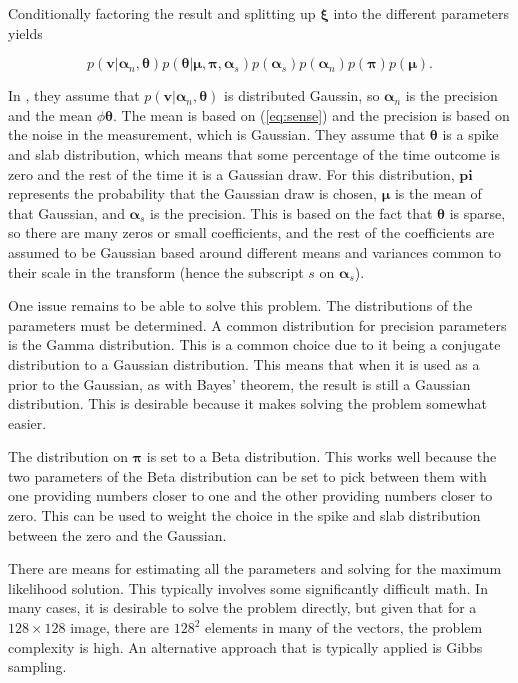 \documentclass{IEEEtran}
\begin{document}
Conditionally factoring the result and splitting up $\mathbf{\xi}$
into the different parameters yields

\begin{equation}
p(\mathbf{v}|\mathbf{\alpha}_n,\mathbf{\theta})p(\mathbf{\theta}|\mathbf{\mu},\mathbf{\pi},\mathbf{\alpha}_s)p(\mathbf{\alpha}_s)p(\mathbf{\alpha}_n)p(\mathbf{\pi})p(\mathbf{\mu}).
\label{bayesprimary}
\end{equation}

In \cite{He09}, they assume that
$p(\mathbf{v}|\mathbf{\alpha}_n,\mathbf{\theta})$ is distributed Gaussin,
so $\mathbf{\alpha}_n$ is the precision and the mean $\phi
\mathbf{\theta}$.  The mean is based on (\ref{eq:sense}) and the
precision is based on the noise in the measurement, which is
Gaussian.  They assume that $\mathbf{\theta}$ is a spike
and slab distribution, which means that some percentage of the time
outcome is zero and the rest of the time it is a Gaussian draw.  For this distribution,
$\mathbf{pi}$ represents the probability that the Gaussian draw is
chosen, $\mathbf{\mu}$ is the mean of that Gaussian, and
$\mathbf{\alpha}_s$ is the precision.  This is based on the fact that
$\mathbf{\theta}$ is sparse, so there are many zeros or small
coefficients, and the rest of the coefficients are assumed to be
Gaussian based around different means and variances common to their
scale in the transform (hence the subscript $s$ on
$\mathbf{\alpha}_s$).

One issue remains to be able to solve this problem.  The distributions of the
parameters must be determined.  A common distribution for precision
parameters is the Gamma distribution.  This is a common choice due to
it being a conjugate distribution to a Gaussian distribution.  This
means that when it is used as a prior to the Gaussian, as with Bayes'
theorem, the result is still a Gaussian distribution.  This is
desirable because it makes solving the problem somewhat easier. 

The distribution on $\mathbf{\pi}$ is set to a Beta distribution.  This
works well because the two parameters of the Beta distribution can be
set to pick between them with one providing numbers closer to one and
the other providing numbers closer to zero.  This can be used to
weight the choice in the spike and slab distribution between the zero
and the Gaussian.  

There are means for estimating all the parameters and solving for the
maximum likelihood solution.  This typically involves some
significantly difficult math.  In many cases, it is desirable to solve
the problem directly, but given that for a $128\times128$ image, there
are $128^2$ elements in many of the vectors, the problem complexity is
high.  An alternative approach that is typically applied is Gibbs
sampling.
\end{document}
